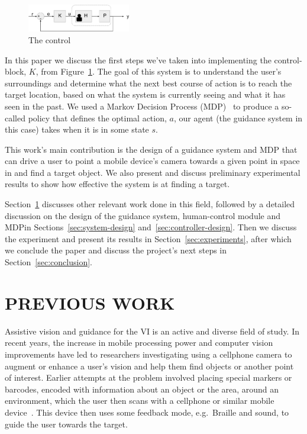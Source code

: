 \documentclass[a4paper, twoside]{article}
\begin{document}
\begin{figure}
  \includegraphics[width=0.4\textwidth]{figures/control_loop.png}
  \caption{The control }\label{fig:control-loop}
\end{figure}

In this paper we discuss the first steps we've taken into implementing the control-block, $K$, from Figure~\ref{fig:control-loop}. The goal of this system is to understand the user's surroundings and determine what the next best course of action is to reach the target location, based on what the system is currently seeing and what it has seen in the past. We used a Markov Decision Process (MDP)~\cite{bellman1957markovian} to produce a so-called policy that defines the optimal action, $a$, our agent (the guidance system in this case) takes when it is in some state $s$.  

This work's main contribution is the design of a guidance system and MDP that can drive a user to point a mobile device's camera towards a given point in space in and find a target object. We also present and discuss preliminary experimental results to show how effective the system is at finding a target.

Section~\ref{sec:previous-work} discusses other relevant work done in this field, followed by a detailed discussion on the design of the guidance system, human-control module and MDP\@ in Sections~\ref{sec:system-design} and~\ref{sec:controller-design}. Then we discuss the experiment and present its results in Section~\ref{sec:experiments}, after which we conclude the paper and discuss the project's next steps in Section~\ref{sec:conclusion}. 

\section{\uppercase{Previous Work}}\label{sec:previous-work}

\noindent Assistive vision and guidance for the VI is an active and diverse field of study. In recent years, the increase in mobile processing power and computer vision improvements have led to researchers investigating using a cellphone camera to augment or enhance a user's vision and help them find objects or another point of interest. Earlier attempts at the problem involved placing special markers or barcodes, encoded with information about an object or the area, around an environment, which the user then scans with a cellphone or similar mobile device~\cite{gude2013blind,iannizzotto2005badge3d,manduchi2012mobile}. This device then uses some feedback mode, e.g.\ Braille and sound, to guide the user towards the target. %
\end{document}

